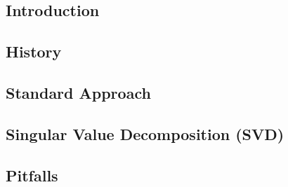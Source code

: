 

\subsection{Introduction}


\clearpage




\subsection{History}

\clearpage




\subsection{Standard Approach}

\clearpage




\subsection{Singular Value Decomposition (SVD)}

\clearpage




\subsection{Pitfalls}

\clearpage

